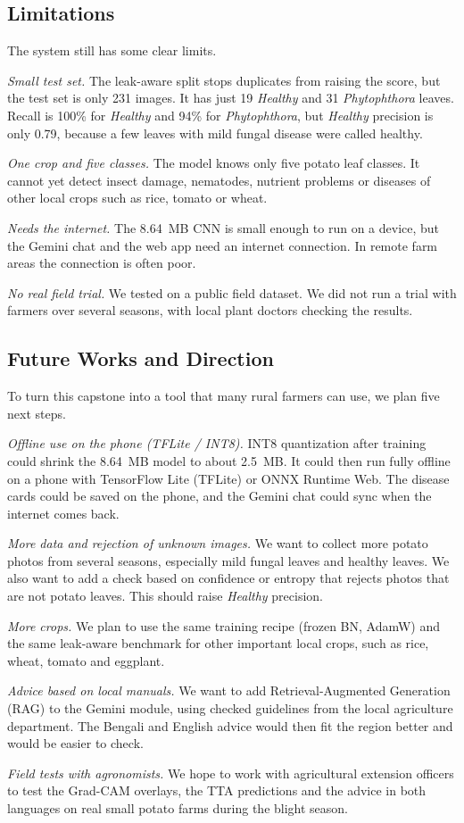 \subsection{Limitations}
The system still has some clear limits.

\textit{Small test set.} The leak-aware split stops duplicates from raising the score, but the test set is only 231 images. It has just 19 \textit{Healthy} and 31 \textit{Phytophthora} leaves. Recall is 100\% for \textit{Healthy} and 94\% for \textit{Phytophthora}, but \textit{Healthy} precision is only 0.79, because a few leaves with mild fungal disease were called healthy.

\textit{One crop and five classes.} The model knows only five potato leaf classes. It cannot yet detect insect damage, nematodes, nutrient problems or diseases of other local crops such as rice, tomato or wheat.

\textit{Needs the internet.} The 8.64~MB CNN is small enough to run on a device, but the Gemini chat and the web app need an internet connection. In remote farm areas the connection is often poor.

\textit{No real field trial.} We tested on a public field dataset. We did not run a trial with farmers over several seasons, with local plant doctors checking the results.

\subsection{Future Works and Direction}
To turn this capstone into a tool that many rural farmers can use, we plan five next steps.

\textit{Offline use on the phone (TFLite / INT8).} INT8 quantization after training could shrink the 8.64~MB model to about 2.5~MB. It could then run fully offline on a phone with TensorFlow Lite (TFLite) or ONNX Runtime Web. The disease cards could be saved on the phone, and the Gemini chat could sync when the internet comes back.

\textit{More data and rejection of unknown images.} We want to collect more potato photos from several seasons, especially mild fungal leaves and healthy leaves. We also want to add a check based on confidence or entropy that rejects photos that are not potato leaves. This should raise \textit{Healthy} precision.

\textit{More crops.} We plan to use the same training recipe (frozen BN, AdamW) and the same leak-aware benchmark for other important local crops, such as rice, wheat, tomato and eggplant.

\textit{Advice based on local manuals.} We want to add Retrieval-Augmented Generation (RAG) to the Gemini module, using checked guidelines from the local agriculture department. The Bengali and English advice would then fit the region better and would be easier to check.

\textit{Field tests with agronomists.} We hope to work with agricultural extension officers to test the Grad-CAM overlays, the TTA predictions and the advice in both languages on real small potato farms during the blight season.
